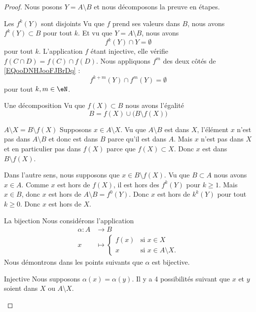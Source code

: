 \begin{proof}
    Nous posons \( Y=A\setminus B\) et nous décomposons la preuve en étapes.
    \begin{subproof}
        \item[Les \( f^k(Y)\) sont disjoints]
            Vu que \( f\) prend ses valeurs dans \( B\), nous avons \( f^k(Y)\subset B\) pour tout \( k\). Et vu que \( Y=A\setminus B\), nous avons
            \begin{equation}        \label{EQooDNHJooFJBrDq}
                f^k(Y)\cap Y=\emptyset
            \end{equation}
            pour tout \( k\). L'application \( f\) étant injective, elle vérifie \( f(C\cap D)=f(C)\cap f(D)\). Nous appliquons \( f^m\) des deux côtés de \eqref{EQooDNHJooFJBrDq} :
            \begin{equation}
                f^{k+m}(Y)\cap f^m(Y)=\emptyset
            \end{equation}
            pour tout \( k,m\in \eN\).
        \item[Une décomposition] 
            Vu que \( f(X)\subset B\) nous avons l'égalité
            \begin{equation}
                B=f(X)\cup\big(B\setminus f(X)\big)
            \end{equation}
        \item[\( A\setminus X=B\setminus f(X)\)]
            Supposons \( x\in A\setminus X\). Vu que \( A\setminus B\) est dans \( X\), l'élément \( x\) n'est pas dans \( A\setminus B\) et donc est dans \( B\) parce qu'il est dans \( A\). Mais \( x\) n'est pas dans \( X\) et en particulier pas dans \( f(X)\) parce que \( f(X)\subset X\). Donc \( x\) est dans \( B\setminus f(X)\).

            Dans l'autre sens, nous supposons que \( x\in B\setminus f(X)\). Vu que \( B\subset A\) nous avons \( x\in A\). Comme \( x\) est hors de \( f(X)\), il est hors des \( f^k(Y)\) pour \( k\geq 1\). Mais \( x\in B\), donc \( x\) est hors de \( A\setminus B=f^0(Y)\). Donc \( x\) est hors de \( k^k(Y)\) pour tout \( k\geq 0\). Donc \( x\) est hors de \( X\).

        \item[La bijection]
            Nous considérons l'application
            \begin{equation}
                \begin{aligned}
                    \alpha\colon A&\to B \\
                    x&\mapsto \begin{cases}
                        f(x)    &   \text{si } x\in X\\
                        x    &    \text{si } x\in A\setminus X.
                    \end{cases}
                \end{aligned}
            \end{equation}
            Nous démontrons dans les points suivants que \( \alpha\) est bijective.
        \item[Injective]
            Nous supposons \( \alpha(x)=\alpha(y)\). Il y a 4 possibilités suivant que \( x\) et \( y\) soient dans \( X\) ou \( A\setminus X\).


\end{subproof}
\end{proof}
